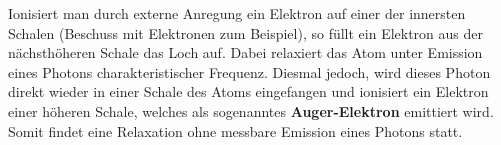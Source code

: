 Ionisiert man durch externe Anregung ein Elektron auf einer der innersten Schalen (Beschuss mit Elektronen zum Beispiel), so füllt ein Elektron aus der nächsthöheren Schale das Loch auf.
Dabei relaxiert das Atom unter Emission eines Photons charakteristischer Frequenz.
Diesmal jedoch, wird dieses Photon direkt wieder in einer Schale des Atoms eingefangen und ionisiert ein Elektron einer höheren Schale, welches als sogenanntes \textbf{Auger-Elektron} emittiert wird.
Somit findet eine Relaxation ohne messbare Emission eines Photons statt.
